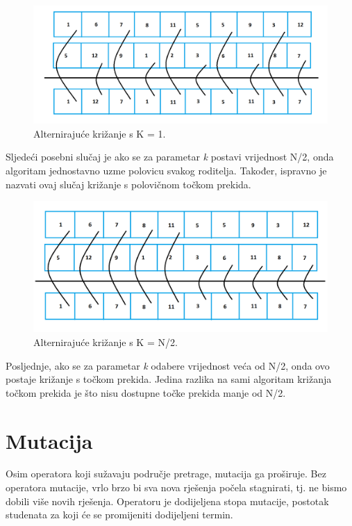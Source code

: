 \documentclass[times, utf8, zavrsni]{fer}
\begin{document}
\begin{figure}[htb]
\centering
\includegraphics[width=14cm]{images/cross_alt_1.png}
\caption{Alternirajuće križanje s K = 1.}
\label{fig:cross_alt_1}
\end{figure}

Sljedeći posebni slučaj je ako se za parametar \emph{k} postavi vrijednost N/2, onda algoritam jednostavno uzme polovicu svakog roditelja. Također, ispravno je nazvati ovaj slučaj križanje s polovičnom točkom prekida.

\begin{figure}[htb]
\centering
\includegraphics[width=14cm]{images/half_cross.png}
\caption{Alternirajuće križanje s K = N/2.}
\label{fig:half_cross}
\end{figure}

\newpage

Posljednje, ako se za parametar \emph{k} odabere vrijednost veća od N/2, onda ovo postaje križanje s točkom prekida. Jedina razlika na sami algoritam križanja točkom prekida je što nisu dostupne točke prekida manje od N/2.

\section{Mutacija}

Osim operatora koji sužavaju područje pretrage, mutacija ga proširuje. Bez operatora mutacije, vrlo brzo bi sva nova rješenja počela stagnirati, tj. ne bismo dobili više novih rješenja. Operatoru je dodijeljena stopa mutacije, postotak studenata za koji će se promijeniti dodijeljeni termin.
\end{document}

